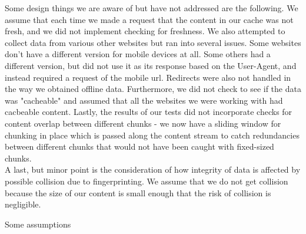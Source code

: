 Some design things we are aware of but have not addressed are the following. We assume that each time we made a request that the content in our cache was not fresh, and we did not implement checking for freshness. We also attempted to collect data from various other websites but ran into several issues. Some websites don't have a different version for mobile devices at all. Some others had a different version, but did not use it as its response based on the User-Agent, and instead required a request of the mobile url. Redirects were also not handled in the way we obtained offline data. Furthermore, we did not check to see if the data was "cacheable" and assumed that all the websites we were working with had cacbeable content. Lastly, the results of our tests did not incorporate checks for content overlap between different chunks -  we now have a sliding window for chunking in place which is passed along the content stream to catch redundancies between different chunks that would not have been caught with fixed-sized chunks. \\

A last, but minor point is the consideration of how integrity of data is affected by possible collision due to fingerprinting. We assume that we do not get collision because the size of our content is small enough that the risk of collision is negligible. 

Some assumptions

%




